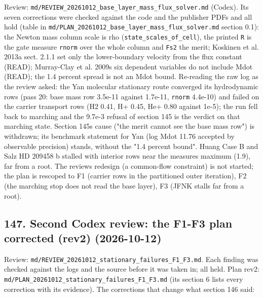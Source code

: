 \documentclass[english,a4paper]{my_memo}
\begin{document}
Review: \texttt{md/REVIEW\_20261012\_base\_layer\_mass\_flux\_solver.md} (Codex). Its seven corrections were checked against the code and the publisher PDFs and all hold (table in \texttt{md/PLAN\_20261012\_base\_layer\_mass\_flux\_solver.md} section 0.1): the Newton mass column scale is rho (\texttt{state\_scales\_of\_cell}), the printed \texttt{\textbar{}\textbar{}R\textbar{}\textbar{}} is the gate measure \texttt{rnorm} over the whole column and \texttt{\textbar{}\textbar{}Fs\textbar{}\textbar{}2} the merit; Koskinen et al. 2013a sect. 2.1.1 set only the lower-boundary velocity from the flux constant (READ); Murray-Clay et al. 2009\textquotesingle s six dependent variables do not include Mdot (READ); the 1.4 percent spread is not an Mdot bound. Re-reading the raw log as the review asked: the Yan molecular stationary route converged its hydrodynamic rows (pass 20: base mass row 3.5e-11 against 1.7e-11, \texttt{rnorm} 4.4e-10) and failed on the carrier transport rows (H2 0.41, H+ 0.45, He+ 0.80 against 1e-5); the run fell back to marching and the 9.7e-3 refusal of section 145 is the verdict on that marching state. Section 145\textquotesingle s cause ("the merit cannot see the base mass row") is withdrawn; its benchmark statement for Yan (log Mdot 11.76 accepted by observable precision) stands, without the "1.4 percent bound". Huang Case B and Salz HD 209458 b stalled with interior rows near the measure\textquotesingle s maximum (1.9), far from a root. The review\textquotesingle s redesign (a common-flow constraint) is not started; the plan is rescoped to F1 (carrier rows in the partitioned outer iteration), F2 (the marching stop does not read the base layer), F3 (JFNK stalls far from a root).

\subsection{147. Second Codex review: the F1-F3 plan corrected (rev2) (2026-10-12)}\label{147-second-codex-review-the-f1-f3-plan-corrected-rev2-2026-10-12}

Review: \texttt{md/REVIEW\_20261012\_stationary\_failures\_F1\_F3.md}. Each finding was checked against the logs and the source before it was taken in; all held. Plan rev2: \texttt{md/PLAN\_20261012\_stationary\_failures\_F1\_F3.md} (its section 6 lists every correction with its evidence). The corrections that change what section 146 said:
\end{document}
